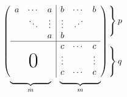 \documentclass{ctexart}
\newcommand{\adots}{\mathinner{
\mkern2mu\raisebox{0.1em}{.}
\mkern2mu\raisebox{0.4em}{.}
\mkern2mu\raisebox{0.7em}{.}\mkern1mu}}
\begin{document}
    \[
    \begin{array}{c@{\hspace{-5pt}}l}
        \left(
            \begin{array}{ccc|ccc}
                a & \cdots & a & b & \cdots & b \\
                  & \ddots & \vdots & \vdots & \adots   \\
                  &        &   a    &   b               \\
                  \hline
                  &        &        &   c   & \cdots & c \\
                  &        &        & \vdots & & \vdots \\
                  \multicolumn{3}{c|}{\raisebox{2ex}[0pt]{\Huge 0}}
                  & c & \cdots & c
            \end{array}
        \right)
        &
        \begin{array}{l}
            \left. \rule{0mm}{7mm}\right\}p     \\
            \\
            \left. \rule{0mm}{7mm}\right\}q     \\

        \end{array}
        \\[-5pt]
        
        \begin{array}{cc}
            \underbrace{\rule{17mm}{0mm}}_m &
            \underbrace{\rule{17mm}{0mm}}_m
        \end{array}
        &
    \end{array}
    \]
\end{document}
